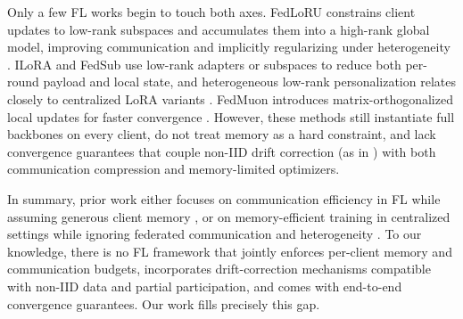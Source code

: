 \documentclass[11pt]{article}
\begin{document}
Only a few FL works begin to touch both axes. FedLoRU constrains client updates to low-rank subspaces and accumulates them into a high-rank global model, improving communication and implicitly regularizing under heterogeneity \citep{Park2024CommunicationEfficientFL}. ILoRA \citep{Zhou2025ILoRAFL} and FedSub \citep{zhang2025efficient} use low-rank adapters or subspaces to reduce both per-round payload and local state, and heterogeneous low-rank personalization relates closely to centralized LoRA variants \citep{Hu2021LoRALA,zhang2023lora,bensaid2025singlora,renduchintala2024tied}. FedMuon introduces matrix-orthogonalized local updates for faster convergence \citep{liu2025fedmuon}. However, these methods still instantiate full backbones on every client, do not treat memory as a hard constraint, and lack convergence guarantees that couple non-IID drift correction (as in \citealp{karimireddy2020scaffold,Cheng2023MomentumBN}) with both communication compression and memory-limited optimizers.

In summary, prior work either focuses on communication efficiency in FL while assuming generous client memory \citep{mcmahan2017communication,konevcny2016federated,Haddadpour2020FederatedLW,Condat2024LoCoDLCD,Huang2023StochasticCA,He2023UnbiasedCS,He2023LowerBA,Fatkhullin2023MomentumPI}, or on memory-efficient training in centralized settings while ignoring federated communication and heterogeneity \citep{Zhao2024GaLoreML,Robert2024LDAdamAO,zhu2024apollo,Rajbhandari2019ZeROMO,Malladi2023FineTuningLM}. To our knowledge, there is no FL framework that jointly enforces per-client memory and communication budgets, incorporates drift-correction mechanisms compatible with non-IID data and partial participation, and comes with end-to-end convergence guarantees. Our work fills precisely this gap.



\end{document}

